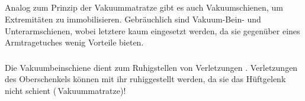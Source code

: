 \begin{ProcedureStepsNoHeading}
{\begin{enumerate}
\end{enumerate}
}{}{}{}{}
\end{ProcedureStepsNoHeading}

\subsection{}
\label{topic:vakuumschiene}
\label{topic:vakuumarmschiene}

Analog zum Prinzip der Vakuummatratze gibt es auch
Vakuumschienen, um Extremitäten zu immobilisieren.
Gebräuchlich sind Vakuum-Bein- und Unterarmschienen, wobei
letztere kaum eingesetzt werden, da sie gegenüber eines
Armtragetuches wenig Vorteile bieten.

\subsubsection{}
\label{topic:vacuumbeinschiene-anwendung}
\label{topic:vacuumbeinschiene-beschreibung}

\Text{\TxBeschreibung}
{%
Die Vakuumbeinschiene dient zum Ruhigstellen von
Verletzungen . Verletzungen des
Oberschenkels können mit ihr  ruhiggestellt werden,
da sie das Hüftgelenk nicht schient
(\,Vakuummatratze)!
% 
}{

}
{}
{}
{}

